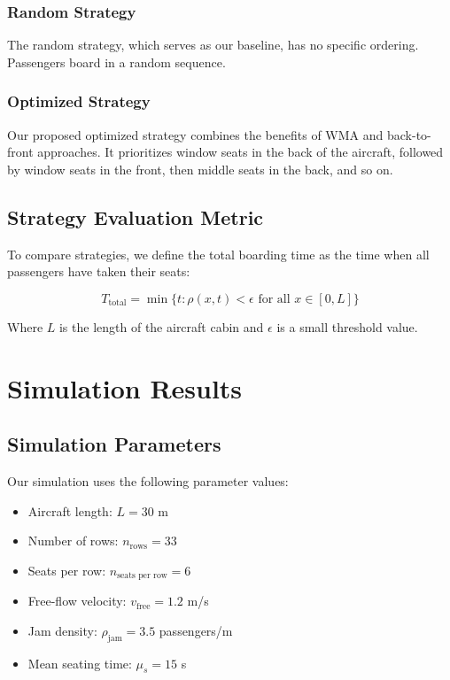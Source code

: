 \documentclass[a4paper,12pt]{article}
\begin{document}
\subsubsection{Random Strategy}

The random strategy, which serves as our baseline, has no specific ordering. Passengers board in a random sequence.

\subsubsection{Optimized Strategy}

Our proposed optimized strategy combines the benefits of WMA and back-to-front approaches. It prioritizes window seats in the back of the aircraft, followed by window seats in the front, then middle seats in the back, and so on.

\subsection{Strategy Evaluation Metric}

To compare strategies, we define the total boarding time as the time when all passengers have taken their seats:

\begin{equation}
T_{\text{total}} = \min\{t : \rho(x,t) < \epsilon \text{ for all } x \in [0, L]\}
\end{equation}

Where $L$ is the length of the aircraft cabin and $\epsilon$ is a small threshold value.

\section{Simulation Results}

\subsection{Simulation Parameters}

Our simulation uses the following parameter values:
\begin{itemize}
    \item Aircraft length: $L = 30$ m
    \item Number of rows: $n_{\text{rows}} = 33$
    \item Seats per row: $n_{\text{seats per row}} = 6$
    \item Free-flow velocity: $v_{\text{free}} = 1.2$ m/s
    \item Jam density: $\rho_{\text{jam}} = 3.5$ passengers/m
    \item Mean seating time: $\mu_s = 15$ s
\end{itemize}
\end{document}
